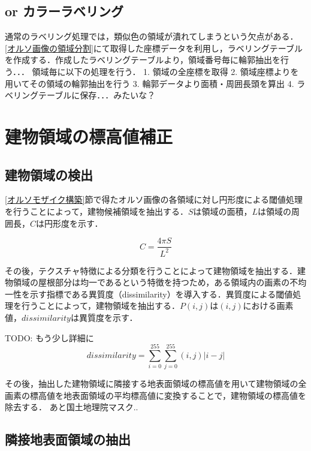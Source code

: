     \subsection{or カラーラベリング}
      通常のラベリング処理では，類似色の領域が潰れてしまうという欠点がある．
      \ref{オルソ画像の領域分割}にて取得した座標データを利用し，ラベリングテーブルを作成する．作成したラベリングテーブルより，領域番号毎に輪郭抽出を行う．．．
      領域毎に以下の処理を行う．
        1. 領域の全座標を取得
        2. 領域座標よりを用いてその領域の輪郭抽出を行う
        3. 輪郭データより面積・周囲長頭を算出
        4. ラベリングテーブルに保存．．．みたいな？
      



  \section{建物領域の標高値補正}
    \subsection{建物領域の検出}
    

      

      \ref{オルソモザイク構築}節で得たオルソ画像の各領域に対し円形度による閾値処理を行うことによって，建物候補領域を抽出する．$S$は領域の面積，$L$は領域の周囲長，$C$は円形度を示す．

      \begin{equation}
        \label{円形度}
        C = \dfrac{4 \pi S} {L^2} 
      \end{equation}

      その後，テクスチャ特徴による分類を行うことによって建物領域を抽出する．建物領域の屋根部分は均一であるという特徴を持つため，ある領域内の画素の不均一性を示す指標である異質度（dissimilarity）\cite{論文手法3}を導入する．異質度による閾値処理を行うことによって，建物領域を抽出する．$P(i,j)$は$(i,j)$における画素値，$dissimilarity$は異質度を示す．

      TODO: もう少し詳細に
      \begin{equation}
        \label{異質度}
        dissimilarity = \sum_{i=0}^{255} \sum_{j=0}^{255} (i,j) |i-j|
      \end{equation}

      その後，抽出した建物領域に隣接する地表面領域の標高値を用いて建物領域の全画素の標高値を地表面領域の平均標高値に変換することで，建物領域の標高値を除去する．
      あと国土地理院マスク..

    \subsection{隣接地表面領域の抽出}


